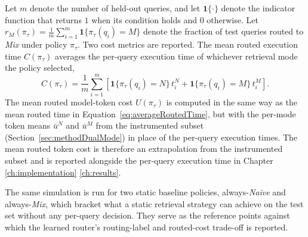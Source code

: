 \documentclass[english, bibtex]{kththesis}               %
\numberwithin{listing}{chapter}
\providecommand{\DIFaddtex}[1]{{\protect\color{blue} \sf #1}} %
\providecommand{\DIFdeltex}[1]{{\protect\color{red} \scriptsize #1}} %
\providecommand{\DIFaddbegin}{} %
\providecommand{\DIFaddend}{} %
\providecommand{\DIFdelbegin}{} %
\providecommand{\DIFdelend}{} %
\providecommand{\DIFadd}[1]{\texorpdfstring{\DIFaddtex{#1}}{#1}} %
\providecommand{\DIFdel}[1]{\texorpdfstring{\DIFdeltex{#1}}{}} %
\begin{document}
Let \(m\) denote the number of held-out queries, and let \(\mathbf{1}\{\cdot\}\) denote the indicator function that returns \(1\) when its condition holds and \(0\) otherwise. Let \(r_M(\pi_\tau) = \tfrac{1}{m}\sum_{i=1}^{m} \mathbf{1}\{\pi_\tau(q_i)=M\}\) denote the fraction of test queries routed to \emph{Mix} under policy \(\pi_\tau\). Two cost metrics are reported. The mean routed execution time \(C(\pi_\tau)\) averages the per-query execution time of whichever retrieval mode the policy selected,
\begin{equation}
\label{eq:averageRoutedTime}
C(\pi_\tau) =
\frac{1}{m}\sum_{i=1}^{m}
\left[
\mathbf{1}\{\pi_\tau(q_i)=N\}\,t_i^N
+ \mathbf{1}\{\pi_\tau(q_i)=M\}\,t_i^M
\right].
\end{equation}
The mean routed model-token cost \(U(\pi_\tau)\) is computed in the same way as the mean routed time in Equation~\ref{eq:averageRoutedTime}, but with the per-mode token means \(\bar{u}^N\) and \(\bar{u}^M\) from the instrumented subset (Section~\ref{sec:methodDualMode}) in place of the per-query execution times. The mean routed token cost is therefore an extrapolation from the instrumented subset and is reported alongside the per-query execution time in Chapter~\DIFdelbegin \DIFdel{\ref{ch:implementation}}\DIFdelend \DIFaddbegin \DIFadd{\ref{ch:results}}\DIFaddend .

The same simulation is run for two static baseline policies, always-\emph{Naive} and always-\emph{Mix}, which bracket what a static retrieval strategy can achieve on the test set without any per-query decision. They serve as the reference points against which the learned router's routing-label and routed-cost trade-off is reported.
\end{document}
